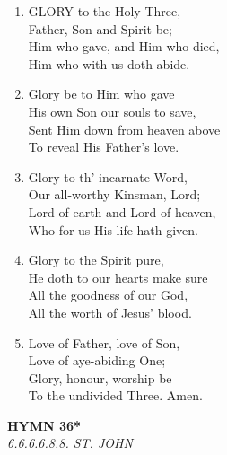 \begin{enumerate}
    \item GLORY to the Holy Three, \\
        Father, Son and Spirit be; \\
        Him who gave, and Him who died, \\
        Him who with us doth abide.

    \item Glory be to Him who gave \\
        His own Son our souls to save, \\
        Sent Him down from heaven above \\
        To reveal His Father's love.

    \item Glory to th' incarnate Word, \\
        Our all-worthy Kinsman, Lord; \\
        Lord of earth and Lord of heaven, \\
        Who for us His life hath given.

    \item Glory to the Spirit pure, \\
        He doth to our hearts make sure \\
        All the goodness of our God, \\
        All the worth of Jesus' blood.

    \item Love of Father, love of Son, \\
        Love of aye-abiding One; \\
        Glory, honour, worship be \\
        To the undivided Three. Amen.

\end{enumerate}

\newpage
\begin{center}
    {\Large \textbf{HYMN 36*}}
    \\
    \textit{6.6.6.6.8.8. ST. JOHN}
\end{center}
\vspace{1em}

